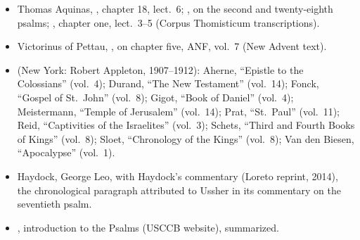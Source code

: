 {\begin{itemize}[leftmargin=1.2em,itemsep=.25em]
twenty-eighth and seventy-first psalms, PG 80; , chapter one, PG 82.
\item Thomas Aquinas, , chapter 18,
lect.~6; , on the second and twenty-eighth
psalms; , chapter one,
lect.~3--5 (Corpus Thomisticum transcriptions).
\item Victorinus of Pettau, , on chapter
five, ANF, vol.~7 (New Advent text).
\item {} (New York: Robert Appleton, 1907--1912):
Aherne, ``Epistle to the Colossians'' (vol.~4); Durand, ``The New Testament''
(vol.~14); Fonck, ``Gospel of St.~John'' (vol.~8); Gigot, ``Book of Daniel''
(vol.~4); Meistermann, ``Temple of Jerusalem'' (vol.~14); Prat, ``St.~Paul''
(vol.~11); Reid, ``Captivities of the Israelites'' (vol.~3); Schets, ``Third
and Fourth Books of Kings'' (vol.~8); Sloet, ``Chronology of the Kings''
(vol.~8); Van den Biesen, ``Apocalypse'' (vol.~1).
\item Haydock, George Leo,  with Haydock's commentary
(Loreto reprint, 2014), the chronological paragraph attributed to Ussher in its
commentary on the seventieth psalm.
\item {}, introduction to the Psalms
(USCCB website), summarized.
\end{itemize}
\par}
